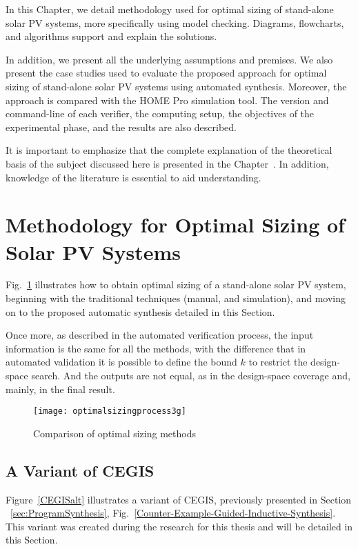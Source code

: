 In this Chapter, we detail methodology used for optimal sizing of stand-alone solar PV systems, more specifically using model checking. Diagrams, flowcharts, and algorithms support and explain the solutions.

In addition, we present all the underlying assumptions and premises. We also present the case studies used to evaluate the proposed approach for optimal sizing of stand-alone solar PV systems using automated synthesis. Moreover, the approach is compared with the HOME Pro simulation tool. The version and command-line of each verifier, the computing setup, the objectives of the experimental phase, and the results are also described.

It is important to emphasize that the complete explanation of the theoretical basis of the subject discussed here is presented in the Chapter~. In addition, knowledge of the literature is essential to aid understanding.

\section{Methodology for Optimal Sizing of Solar PV Systems}

Fig.~\ref{fig:optimization} illustrates how to obtain optimal sizing of a stand-alone solar PV system, beginning with the traditional techniques (manual, and simulation), and moving on to the proposed automatic synthesis detailed in this Section. 

Once more, as described in the automated verification process, the input information is the same for all the methods, with the difference that in automated validation it is possible to define the bound $k$ to restrict the design-space search. And the outputs are not equal, as in the design-space coverage and, mainly, in the final result.

\begin{figure}[h]
\texttt{[image: optimalsizingprocess3g]}
\centering
\caption{Comparison of optimal sizing methods}
\label{fig:optimization}
\end{figure}
 
\subsection{A Variant of CEGIS} 

Figure~\ref{CEGISalt} illustrates a variant of CEGIS, previously presented in Section ~\ref{sec:ProgramSynthesis}, Fig.~\ref{Counter-Example-Guided-Inductive-Synthesis}. This variant was created during the research for this thesis and will be detailed in this Section.

